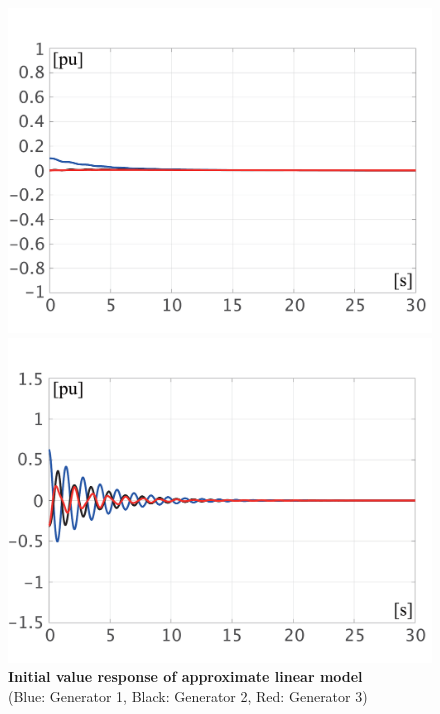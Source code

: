 \documentclass[graybox, envcountchap]{svmult}
\begin{document}
\begin{figure}[t]
{\begin{minipage}{0.49\linewidth}
    \includegraphics[width = 1.0\linewidth]{figs/Elin}
    \medskip
  \end{minipage}
  \begin{minipage}{0.49\linewidth}
    \centering
    \includegraphics[width = 1.0\linewidth]{figs/Plin}
    \medskip
  \end{minipage}
  }
  \medskip
  \caption{\textbf{Initial value response of approximate linear model}
  \\  \centering(Blue: Generator 1, Black: Generator 2, Red: Generator 3)}
  \label{fig:timeex}
\medskip
\end{figure}
\end{document}
